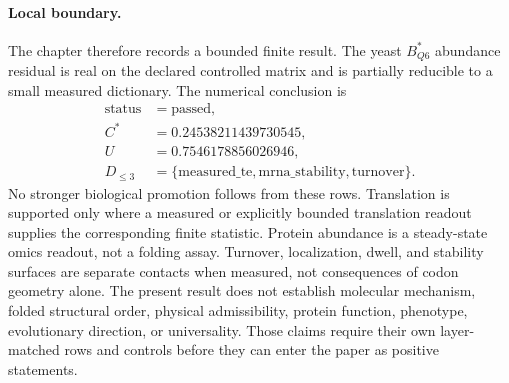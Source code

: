 \paragraph{Local boundary.}
The chapter therefore records a bounded finite result.  The yeast $B^{\ast}_{Q6}$ abundance residual is real on the declared controlled matrix and is partially reducible to a small measured dictionary.  The numerical conclusion is
$$
\begin{aligned}
\mathrm{status}&=\mathrm{passed},\\
C^{\ast}&=0.24538211439730545,\\
U&=0.7546178856026946,\\
D_{\leq 3}&=\{\mathrm{measured\_te},\mathrm{mrna\_stability},\mathrm{turnover}\}.
\end{aligned}
$$
No stronger biological promotion follows from these rows.  Translation is supported only where a measured or explicitly bounded translation readout supplies the corresponding finite statistic.  Protein abundance is a steady-state omics readout, not a folding assay.  Turnover, localization, dwell, and stability surfaces are separate contacts when measured, not consequences of codon geometry alone.  The present result does not establish molecular mechanism, folded structural order, physical admissibility, protein function, phenotype, evolutionary direction, or universality.  Those claims require their own layer-matched rows and controls before they can enter the paper as positive statements.